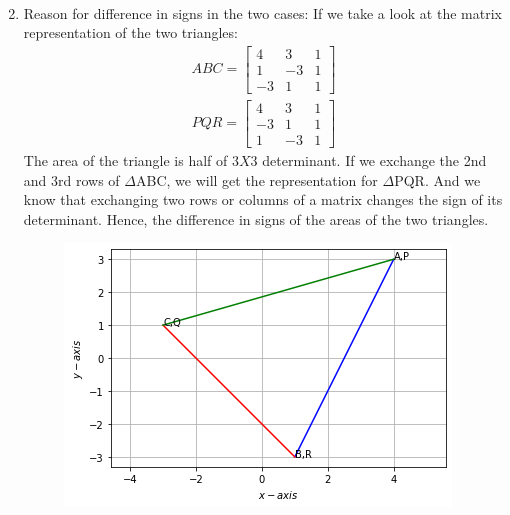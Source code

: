 \documentclass[journal,12pt,twocolumn]{IEEEtran}
\renewcommand\thesection{\arabic{section}}
\begin{document}
\begin{enumerate}[label=\thesection.\arabic*.,ref=\thesection.\theenumi]
\begin{align}
\end{align}
\item Reason for difference in signs in the two cases:
\newline
If we take a look at the matrix representation of the two triangles:
\begin{align}
ABC=\begin{bmatrix}
 4 &  3 & 1\\ 
 1 & -3 & 1\\ 
-3 &  1 & 1
\end{bmatrix}    
\end{align}
\begin{align}
PQR=\begin{bmatrix}
 4 &  3 & 1\\ 
 -3 & 1 & 1\\ 
 1 & -3 & 1
\end{bmatrix}   
\end{align}
The area of the triangle is half of $3X3$ determinant. If we exchange the 2nd and 3rd rows of $\Delta$ABC, we will get the representation for $\Delta$PQR. And we know that exchanging two rows or columns of a matrix changes the sign of its determinant. Hence, the difference in signs of the areas of the two triangles.

\begin{figure}[!ht]
	\centering
	\includegraphics[width=\columnwidth]{triangle.png}
\end{figure}
\end{enumerate}
\end{document}
